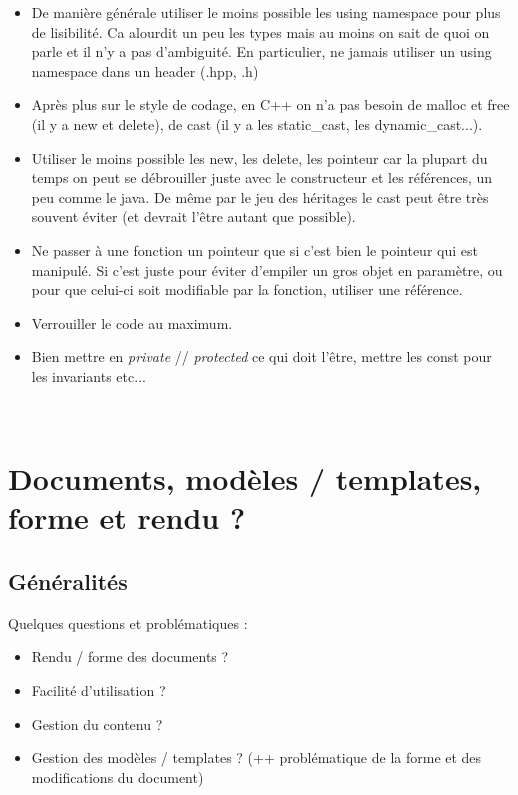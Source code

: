 \documentclass[11pt,twoside,a4paper]{article}
\begin{document}
\begin{itemize}
	\item De mani{\`e}re g{\'e}n{\'e}rale utiliser le moins possible les using namespace pour plus de lisibilit{\'e}. Ca alourdit un peu les types mais au moins on sait de quoi on parle et il n'y a pas d'ambiguit{\'e}. En particulier, ne jamais utiliser un using namespace dans un header (.hpp, .h)
	\item Apr{\`e}s plus sur le style de codage, en C++ on n'a pas besoin de malloc et free (il y a new et delete), de cast (il y a les static\_cast, les dynamic\_cast...).
	\item Utiliser le moins possible les new, les delete, les pointeur car la plupart du temps on peut se d{\'e}brouiller juste avec le constructeur et les r{\'e}f{\'e}rences, un peu comme le java. De m{\^e}me par le jeu des h{\'e}ritages le cast peut {\^e}tre tr{\`e}s souvent {\'e}viter (et devrait l'{\^e}tre autant que possible).
	\item Ne passer {\`a} une fonction un pointeur que si c'est bien le pointeur qui est manipul{\'e}. Si c'est juste pour {\'e}viter d'empiler un gros objet en param{\`e}tre, ou pour que celui-ci soit modifiable par la fonction, utiliser une r{\'e}f{\'e}rence.
	\item Verrouiller le code au maximum. 
	\item Bien mettre en \emph{private} // \emph{protected} ce qui doit l'{\^e}tre, mettre les const pour les invariants etc...
\end{itemize}~\\

\clearpage

\section{Documents, mod{\`e}les / templates, forme et rendu ?}

\subsection{G{\'e}n{\'e}ralit{\'e}s}

Quelques questions et probl{\'e}matiques : 
	\begin{itemize}
		\item[] Rendu / forme des documents ?
		\item[] Facilit{\'e} d'utilisation ?
		\item[] Gestion du contenu ?
		\item[] Gestion des mod{\`e}les / templates ? (++ probl{\'e}matique de la forme et des modifications du document)
	\end{itemize}~\\
\end{document}
